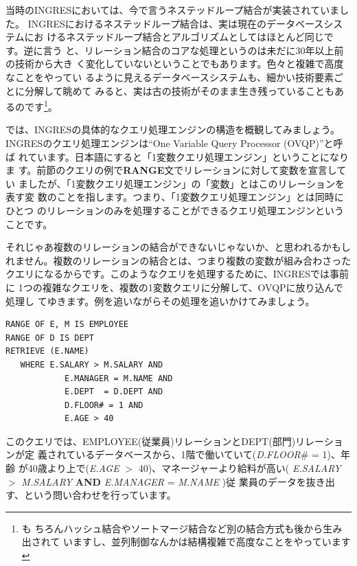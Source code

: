 当時のINGRESにおいては、今で言うネステッドループ結合が実装されていました。
INGRESにおけるネステッドループ結合は、実は現在のデータベースシステムにお
けるネステッドループ結合とアルゴリズムとしてはほとんど同じです。逆に言う
と、リレーション結合のコアな処理というのは未だに30年以上前の技術から大き
く変化していないということでもあります。色々と複雑で高度なことをやってい
るように見えるデータベースシステムも、細かい技術要素ごとに分解して眺めて
みると、実は古の技術がそのまま生き残っていることもあるのです\footnote{も
ちろんハッシュ結合やソートマージ結合など別の結合方式も後から生み出されて
いますし、並列制御なんかは結構複雑で高度なことをやっています}。


では、INGRESの具体的なクエリ処理エンジンの構造を概観してみましょう。
INGRESのクエリ処理エンジンは``One Variable Query Processor (OVQP)''と呼ば
れています。日本語にすると「1変数クエリ処理エンジン」ということになりま
す。前節のクエリの例で{\bf RANGE}文でリレーションに対して変数を宣言してい
ましたが、「1変数クエリ処理エンジン」の「変数」とはこのリレーションを表す変
数のことを指します。つまり、「1変数クエリ処理エンジン」とは同時にひとつ
のリレーションのみを処理することができるクエリ処理エンジンということです。

それじゃあ複数のリレーションの結合ができないじゃないか、と思われるかもし
れません。複数のリレーションの結合とは、つまり複数の変数が組み合わさった
クエリになるからです。このようなクエリを処理するために、INGRESでは事前に
1つの複雑なクエリを、複数の1変数クエリに分解して、OVQPに放り込んで処理し
てゆきます。例を追いながらその処理を追いかけてみましょう。


\begin{center}
 \begin{minipage}{0.8\textwidth}
  \begin{lstlisting}
RANGE OF E, M IS EMPLOYEE
RANGE OF D IS DEPT
RETRIEVE (E.NAME)
   WHERE E.SALARY > M.SALARY AND
            E.MANAGER = M.NAME AND
            E.DEPT  = D.DEPT AND
            D.FLOOR# = 1 AND
            E.AGE > 40
  \end{lstlisting}
 \end{minipage}
\end{center}

このクエリでは、EMPLOYEE(従業員)リレーションとDEPT(部門)リレーションが定
義されているデータベースから、1階で働いていて({\it D.FLOOR}\# = 1)、年齢
が40歳より上で({\it E.AGE} $>$ 40)、マネージャーより給料が高い({\it
E.SALARY} $>$ {\it M.SALARY} {\bf AND} {\it E.MANAGER} = {\it M.NAME} )従
業員のデータを抜き出す、という問い合わせを行っています。

